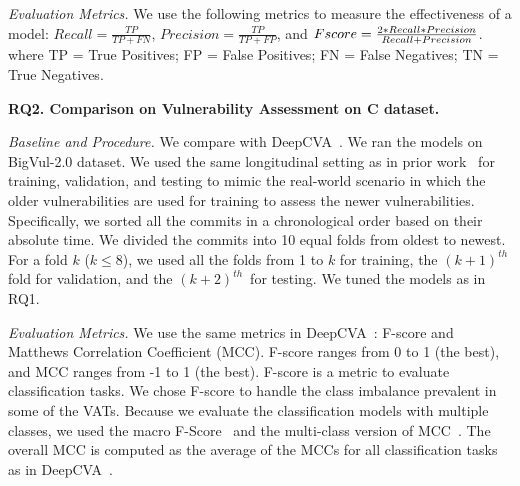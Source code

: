 \emph{Evaluation Metrics.} We use the following metrics to measure the
effectiveness of a model: $Recall = \frac{TP}{TP+FN}$, $Precision =
\frac{TP}{TP+FP}$, and $F\-score =
\frac{2*Recall*Precision}{Recall+Precision}$.
where TP = True Positives; FP = False Positives; FN = False Negatives; TN = True Negatives.


\noindent\textbf{RQ2. Comparison on Vulnerability Assessment on C dataset.}

{\em Baseline and Procedure.} We compare {\tool} with
DeepCVA~\cite{deepCVA-ase21}. We ran the models on BigVul-2.0
dataset. We used the same longitudinal setting as in prior
work~\cite{deepCVA-ase21,falessi2020need} for training, validation,
and testing to mimic the real-world scenario in which the older
vulnerabilities are used for training to assess the newer
vulnerabilities. Specifically, we sorted all the commits in a
chronological order based on their absolute time. We divided the
commits into 10 equal folds from oldest to newest. For a fold $k$ ($k
\le 8$), we used all the folds from 1 to $k$ for training, the
$(k+1)^{th}$ fold for validation, and the $(k+2)^{th}$~for testing. We
tuned the models as in RQ1.



\emph{Evaluation Metrics.} We use the same metrics in
DeepCVA~\cite{deepCVA-ase21}: F-score and Matthews Correlation
Coefficient (MCC). F-score ranges from 0 to 1 (the best), and MCC
ranges from -1 to 1 (the best). F-score is a metric to evaluate
classification tasks. We chose F-score to handle the class imbalance
prevalent in some of the VATs. Because we evaluate the classification
models with multiple classes, we used the macro
F-Score~\cite{spanos2018multi} and the multi-class version of
MCC~\cite{gorodkin04}. The overall MCC is computed as the average of
the MCCs for all classification tasks as in DeepCVA~\cite{deepCVA-ase21}.

